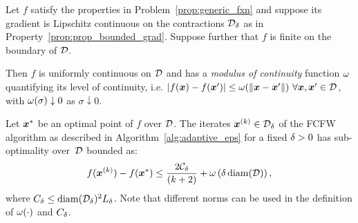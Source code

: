 \begin{theorem}
  \label{thm:convergence_fixed_eps}
  Let $f$ satisfy the properties in Problem~\ref{prop:generic_fxn} and suppose its gradient is Lipschitz continuous on the contractions $\mathcal{D}_{\delta}$ as in Property~\ref{prop:prop_bounded_grad}. Suppose further that $f$ is finite on the boundary of $\mathcal{D}$. 
  
  Then $f$ is uniformly continuous on $\mathcal{D}$ and has a \emph{modulus of continuity} function $\omega$ quantifying its level of continuity, i.e. 
  $|f(\bm{x}) - f(\bm{x}')| \leq \omega(\|\bm{x} - \bm{x}'\|) \,\, \forall \bm{x}, \bm{x}' \in \mathcal{D}$, with $\omega(\sigma) \downarrow 0$ as $\sigma \downarrow 0$.
  
  Let $\bm{x}^*$ be an optimal point of $f$ over $\mathcal{D}$. The iterates $\bm{x}^{(k)} \in \mathcal{D}_{\delta}$ of the FCFW algorithm as described in Algorithm~\ref{alg:adaptive_eps} for a fixed $\delta > 0$ has sub-optimality over~$\mathcal{D}$ bounded as:
	\begin{equation} \label{eq:rate_fixed_delta}
	f(\bm{x}^{(k)}) - f(\bm{x}^*) \leq \frac{2\mathcal{C}_{\delta}}{(k+2)}+\omega \left( \delta \operatorname{diam}(\mathcal{D})\right), 
	\end{equation}
	 where $C_{\delta} \leq \operatorname{diam}(\mathcal{D}_{\delta})^2 L_{\delta}$. Note that different norms can be used in the definition of $\omega(\cdot)$ and $C_\delta$.
\end{theorem}

